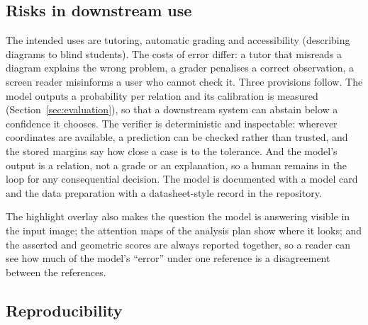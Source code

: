 \subsection{Risks in downstream use}

The intended uses are tutoring, automatic grading and accessibility (describing diagrams to blind students). The costs of error differ: a tutor that misreads a diagram explains the wrong problem, a grader penalises a correct observation, a screen reader misinforms a user who cannot check it. Three provisions follow. The model outputs a probability per relation and its calibration is measured (Section~\ref{sec:evaluation}), so that a downstream system can abstain below a confidence it chooses. The verifier is deterministic and inspectable: wherever coordinates are available, a prediction can be checked rather than trusted, and the stored margins say how close a case is to the tolerance. And the model's output is a relation, not a grade or an explanation, so a human remains in the loop for any consequential decision. The model is documented with a model card \cite{mitchell2019modelcards} and the data preparation with a datasheet-style record \cite{gebru2021datasheets} in the repository.

The highlight overlay also makes the question the model is answering visible in the input image; the attention maps of the analysis plan show where it looks; and the asserted and geometric scores are always reported together, so a reader can see how much of the model's ``error'' under one reference is a disagreement between the references.

\subsection{Reproducibility}

